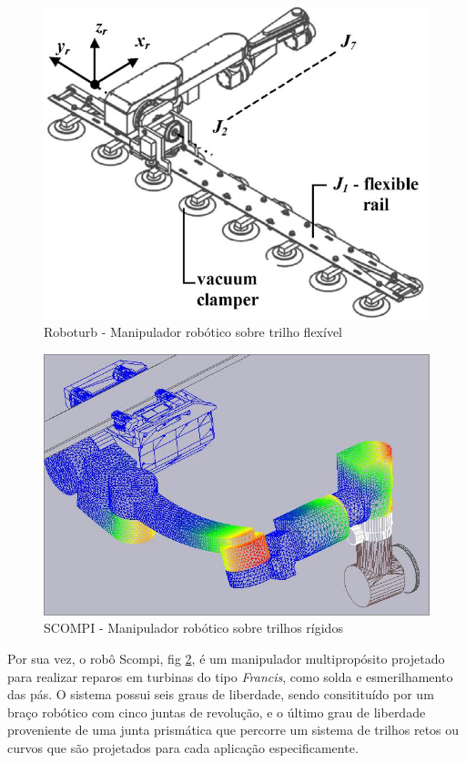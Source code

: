     \begin{figure}[h!]
    \centering	
		\includegraphics[width=0.8\columnwidth]{sota/figs/trilhos/roboturbpaper}
		\caption{Roboturb \citep{roboturb} - Manipulador robótico sobre trilho
		flexível}
		\label{fig::roboturb}
	\end{figure}
	\begin{figure}[h!]
	\centering
		\includegraphics[width=0.8\columnwidth]{sota/figs/trilhos/scompi}
		\caption{SCOMPI \citep{scompi} - Manipulador robótico sobre trilhos rígidos}
		\label{fig::scompi}
	\end{figure}

Por sua vez, o robô Scompi, fig \ref{fig::scompi}, é um manipulador
multipropósito projetado para realizar reparos em turbinas do tipo \textit{Francis},
 como solda e esmerilhamento das pás. O sistema possui seis graus de liberdade,
 sendo consitituído por um braço robótico com cinco juntas de revolução, e o
 último grau de liberdade proveniente de uma junta prismática que percorre um sistema de 
 trilhos retos ou curvos que são projetados para cada aplicação especificamente. 


